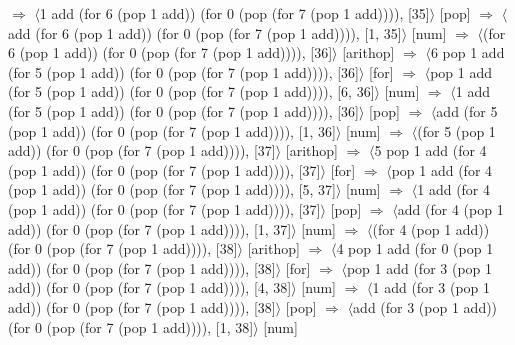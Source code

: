 \documentclass[12pt]{report}
\begin{document}
$\Rightarrow$ $\langle$1 add (for 6 (pop 1 add)) (for 0 (pop (for 7 (pop 1 add)))), [35]$\rangle$ \hfill [pop] \newline
$\Rightarrow$ $\langle$add (for 6 (pop 1 add)) (for 0 (pop (for 7 (pop 1 add)))), [1, 35]$\rangle$ \hfill [num] \newline
$\Rightarrow$ $\langle$(for 6 (pop 1 add)) (for 0 (pop (for 7 (pop 1 add)))), [36]$\rangle$ \hfill [arithop] \newline
$\Rightarrow$ $\langle$6 pop 1 add (for 5 (pop 1 add)) (for 0 (pop (for 7 (pop 1 add)))), [36]$\rangle$ \hfill [for] \newline
$\Rightarrow$ $\langle$pop 1 add (for 5 (pop 1 add)) (for 0 (pop (for 7 (pop 1 add)))), [6, 36]$\rangle$ \hfill [num] \newline
$\Rightarrow$ $\langle$1 add (for 5 (pop 1 add)) (for 0 (pop (for 7 (pop 1 add)))), [36]$\rangle$ \hfill [pop] \newline
$\Rightarrow$ $\langle$add (for 5 (pop 1 add)) (for 0 (pop (for 7 (pop 1 add)))), [1, 36]$\rangle$ \hfill [num] \newline
$\Rightarrow$ $\langle$(for 5 (pop 1 add)) (for 0 (pop (for 7 (pop 1 add)))), [37]$\rangle$ \hfill [arithop] \newline
$\Rightarrow$ $\langle$5 pop 1 add (for 4 (pop 1 add)) (for 0 (pop (for 7 (pop 1 add)))), [37]$\rangle$ \hfill [for] \newline
$\Rightarrow$ $\langle$pop 1 add (for 4 (pop 1 add)) (for 0 (pop (for 7 (pop 1 add)))), [5, 37]$\rangle$ \hfill [num] \newline
$\Rightarrow$ $\langle$1 add (for 4 (pop 1 add)) (for 0 (pop (for 7 (pop 1 add)))), [37]$\rangle$ \hfill [pop] \newline
$\Rightarrow$ $\langle$add (for 4 (pop 1 add)) (for 0 (pop (for 7 (pop 1 add)))), [1, 37]$\rangle$ \hfill [num] \newline
$\Rightarrow$ $\langle$(for 4 (pop 1 add)) (for 0 (pop (for 7 (pop 1 add)))), [38]$\rangle$ \hfill [arithop] \newline
$\Rightarrow$ $\langle$4 pop 1 add (for 0 (pop 1 add)) (for 0 (pop (for 7 (pop 1 add)))), [38]$\rangle$ \hfill [for] \newline
$\Rightarrow$ $\langle$pop 1 add (for 3 (pop 1 add)) (for 0 (pop (for 7 (pop 1 add)))), [4, 38]$\rangle$ \hfill [num] \newline
$\Rightarrow$ $\langle$1 add (for 3 (pop 1 add)) (for 0 (pop (for 7 (pop 1 add)))), [38]$\rangle$ \hfill [pop] \newline
$\Rightarrow$ $\langle$add (for 3 (pop 1 add)) (for 0 (pop (for 7 (pop 1 add)))), [1, 38]$\rangle$ \hfill [num] \newline
\end{document}
